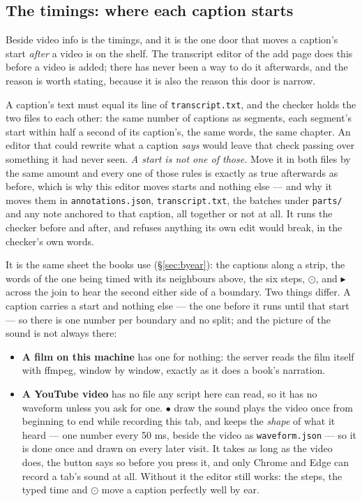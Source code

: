 \documentclass[11pt,oneside]{report}
\newcommand{\file}[1]{\texttt{#1}}
\newcommand{\menu}[1]{\textsf{#1}}
\begin{document}
\subsection*{The timings: where each caption starts}
\label{sec:captimes}

Beside \menu{video info} is \menu{the timings}, and it is the one door that
moves a caption's start \emph{after} a video is on the shelf. The transcript
editor of the add page does this before a video is added; there has never
been a way to do it afterwards, and the reason is worth stating, because it
is also the reason this door is narrow.

A caption's text must equal its line of \file{transcript.txt}, and the
checker holds the two files to each other: the same number of captions as
segments, each segment's start within half a second of its caption's, the
same words, the same chapter. An editor that could rewrite what a caption
\emph{says} would leave that check passing over something it had never seen.
\emph{A start is not one of those.} Move it in both files by the same amount
and every one of those rules is exactly as true afterwards as before, which
is why this editor moves starts and nothing else --- and why it moves them
in \file{annotations.json}, \file{transcript.txt}, the batches under
\file{parts/} and any note anchored to that caption, all together or not at
all. It runs the checker before and after, and refuses anything its own edit
would break, in the checker's own words.

It is the same sheet the books use (\S\ref{sec:byear}): the captions along a
strip, the words of the one being timed with its neighbours above, the six
steps, $\odot$, and \menu{$\blacktriangleright$ across the join} to hear the
second either side of a boundary. Two things differ. A caption carries a
start and nothing else --- the one before it runs until that start --- so
there is one number per boundary and no \menu{split}; and the picture of the
sound is not always there:

\begin{itemize}
\item \textbf{A film on this machine} has one for nothing: the server reads
  the film itself with ffmpeg, window by window, exactly as it does a book's
  narration.
\item \textbf{A YouTube video} has no file any script here can read, so it
  has no waveform unless you ask for one. \menu{$\bullet$ draw the sound}
  plays the video once from beginning to end while recording this tab, and
  keeps the \emph{shape} of what it heard --- one number every 50 ms, beside
  the video as \file{waveform.json} --- so it is done once and drawn on
  every later visit. It takes as long as the video does, the button says so
  before you press it, and only Chrome and Edge can record a tab's sound at
  all. Without it the editor still works: the steps, the typed time and
  $\odot$ move a caption perfectly well by ear.
\end{itemize}
\end{document}

